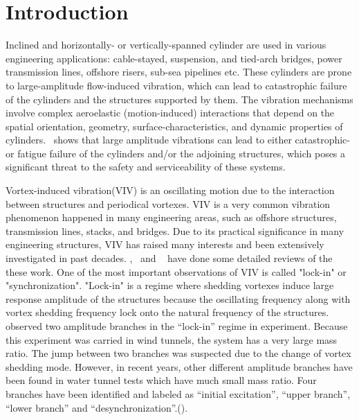 \documentclass[12pt,authoryear]{elsarticle}
\begin{document}

\section{Introduction}
\label{sec:intro}
%
Inclined and horizontally- or vertically-spanned cylinder are used in various
engineering applications: cable-stayed, suspension, and tied-arch bridges,
power transmission lines, offshore risers, sub-sea pipelines etc. These
cylinders are prone to large-amplitude flow-induced vibration, which can
lead to catastrophic failure of the cylinders and the structures supported by
them. The vibration mechanisms involve complex aeroelastic (motion-induced)
interactions that depend on the spatial orientation, geometry,
surface-characteristics, and dynamic properties of cylinders.~\cite{davenport1995dynamics} 
shows that large amplitude vibrations can lead to
either catastrophic- or fatigue failure of the cylinders and/or the adjoining
structures, which poses a significant threat to the safety and serviceability of
these systems.

Vortex-induced vibration(VIV) is an oscillating motion due to the interaction
between structures and periodical vortexes. VIV is a very common vibration
phenomenon happened in many engineering areas, such as offshore structures,
transmission lines, stacks, and bridges. Due to its practical significance in
many engineering structures, VIV has raised many interests and been extensively
investigated in past decades.
\cite{bearman1984vortex},~\cite{sarpkaya2004critical} and
~\cite{williamson2004vortex} have done some detailed reviews of the these work.
One of the most important observations of VIV is called "lock-in" or
"synchronization". "Lock-in" is a regime where shedding vortexes induce large
response amplitude of the structures because the oscillating frequency along
with vortex shedding frequency lock onto the natural frequency of the
structures. ~\cite{feng1968measurement} observed two amplitude branches in the
``lock-in'' regime in experiment. Because this experiment was carried in wind
tunnels, the system has a very large mass ratio. The jump between two branches
was suspected due to the change of vortex shedding mode.    However, in recent
years, other different amplitude branches have been found in water tunnel tests
which have much small mass ratio. Four branches have been identified and
labeled as ``initial excitation'', ``upper branch'', ``lower branch'' and
``desynchronization''.(\cite{khalak1997fluid}). 
\end{document}
